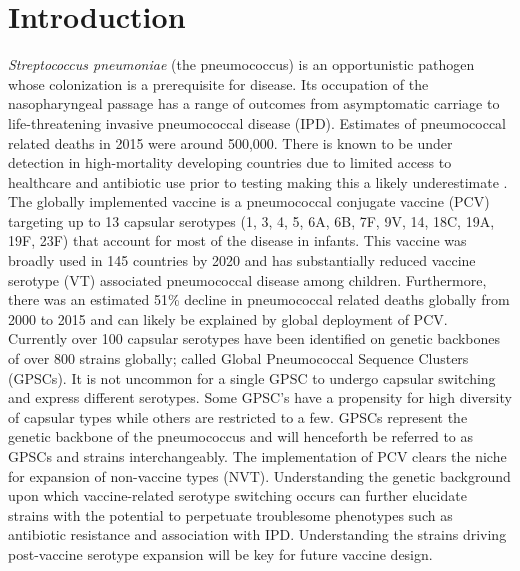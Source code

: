 \documentclass{article}
\begin{document}
\section{Introduction}
\textit{Streptococcus pneumoniae} (the pneumococcus) is an opportunistic pathogen whose colonization is a prerequisite for disease. Its occupation of the nasopharyngeal passage has a range of outcomes from asymptomatic carriage to life-threatening invasive pneumococcal disease (IPD)\cite{weiserStreptococcusPneumoniaeTransmission2018}. Estimates of pneumococcal related deaths in 2015 were around 500,000\cite{wahlBurdenStreptococcusPneumoniae2018}. There is known to be under detection in high-mortality developing countries due to limited access to healthcare and antibiotic use prior to testing making this a likely underestimate \cite{obrienBurdenDiseaseCaused2009,troegerEstimatesGlobalRegional2017}.
\\The globally implemented vaccine is a pneumococcal conjugate vaccine (PCV) targeting up to 13 capsular serotypes (1, 3, 4, 5, 6A, 6B, 7F, 9V, 14, 18C, 19A, 19F, 23F) that account for most of the disease in infants\cite{VaccineInformationStatement2019}. This vaccine was broadly used in 145 countries by 2020 and has substantially reduced vaccine serotype (VT) associated pneumococcal disease among children\cite{pilishviliSustainedReductionsInvasive2010,vongottbergEffectsVaccinationInvasive2014}. Furthermore, there was an estimated 51\% decline in pneumococcal related deaths globally from 2000 to 2015 and can likely be explained by global deployment of PCV\cite{wahlBurdenStreptococcusPneumoniae2018}.  
\\Currently over 100 capsular serotypes have been identified on genetic backbones of over 800 strains globally; called Global Pneumococcal Sequence Clusters (GPSCs). It is not uncommon for a single GPSC to undergo capsular switching and express different serotypes. Some GPSC’s have a propensity for high diversity of capsular types while others are restricted to a few\cite{loPneumococcalLineagesAssociated2019}. GPSCs represent the genetic backbone of the pneumococcus and will henceforth be referred to as GPSCs and strains interchangeably. The implementation of PCV clears the niche for expansion of non-vaccine types (NVT). Understanding the genetic background upon which vaccine-related serotype switching occurs can further elucidate strains with the potential to perpetuate troublesome phenotypes such as antibiotic resistance and association with IPD. Understanding the strains driving post-vaccine serotype expansion will be key for future vaccine design\cite{loPneumococcalLineagesAssociated2019}. 
\end{document}
